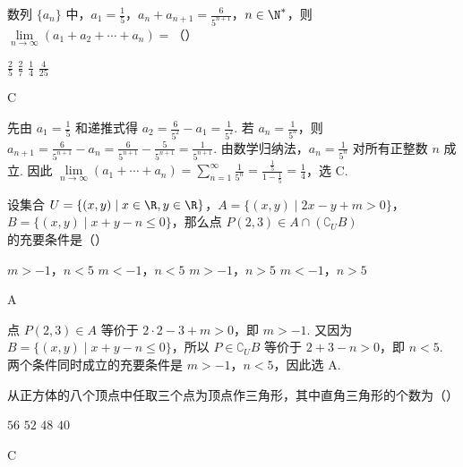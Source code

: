 \begin{problem}
数列 \(\{a_n\}\) 中，\(a_1=\frac{1}{5}\)，\(a_n+a_{n+1}=\frac{6}{5^{n+1}}\)，\(n\in \N^{*}\)，则 \(\lim\limits_{n\to\infty}(a_1+a_2+\cdots+a_n)=\)（\quad）

\choices
    {\(\frac{2}{5}\)}
    {\(\frac{2}{7}\)}
    {\(\frac{1}{4}\)}
    {\(\frac{4}{25}\)}
\end{problem}

\begin{answer}
C
\end{answer}

\begin{solution}
先由 \(a_1=\frac{1}{5}\) 和递推式得 \(a_2=\frac{6}{5^2}-a_1=\frac{1}{5^2}\). 若 \(a_n=\frac{1}{5^n}\)，则 \(a_{n+1}=\frac{6}{5^{n+1}}-a_n=\frac{6}{5^{n+1}}-\frac{5}{5^{n+1}}=\frac{1}{5^{n+1}}\). 由数学归纳法，\(a_n=\frac{1}{5^n}\) 对所有正整数 \(n\) 成立. 因此 \(\lim\limits_{n\to\infty}(a_1+\cdots+a_n)=\sum_{n=1}^{\infty}\frac{1}{5^n}=\frac{\frac{1}{5}}{1-\frac{1}{5}}=\frac{1}{4}\)，选 C.
\end{solution}

\begin{problem}
设集合 \(U=\{(x,y)\mid x\in\R, y\in\R\}\)，\(A=\{(x,y)\mid 2x-y+m>0\}\)，\(B=\{(x,y)\mid x+y-n\leqslant 0\}\)，那么点 \(P(2,3)\in A\cap(\complement_{U}B)\) 的充要条件是（\quad）

\choices
    {\(m>-1\)，\(n<5\)}
    {\(m<-1\)，\(n<5\)}
    {\(m>-1\)，\(n>5\)}
    {\(m<-1\)，\(n>5\)}
\end{problem}

\begin{answer}
A
\end{answer}

\begin{solution}
点 \(P(2,3)\in A\) 等价于 \(2\cdot2-3+m>0\)，即 \(m>-1\). 又因为 \(B=\{(x,y)\mid x+y-n\leqslant0\}\)，所以 \(P\in\complement_U B\) 等价于 \(2+3-n>0\)，即 \(n<5\). 两个条件同时成立的充要条件是 \(m>-1\)，\(n<5\)，因此选 A.
\end{solution}

\begin{problem}
从正方体的八个顶点中任取三个点为顶点作三角形，其中直角三角形的个数为（\quad）

\choices
    {\(56\)}
    {\(52\)}
    {\(48\)}
    {\(40\)}
\end{problem}

\begin{answer}
C
\end{answer}

